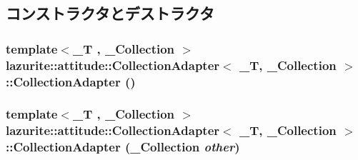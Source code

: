\subsection{コンストラクタとデストラクタ}
\hypertarget{classlazurite_1_1attitude_1_1_collection_adapter_3_01___t_00_01___collection_01_4_a582a6fdefe2ce5009133aca0ca88fdae}{
\subsubsection[{CollectionAdapter}]{\setlength{\rightskip}{0pt plus 5cm}template$<$\_\-T , \_\-Collection $>$ lazurite::attitude::CollectionAdapter$<$ \_\-T, \_\-Collection $>$::CollectionAdapter ()}}
\label{classlazurite_1_1attitude_1_1_collection_adapter_3_01___t_00_01___collection_01_4_a582a6fdefe2ce5009133aca0ca88fdae}
\hypertarget{classlazurite_1_1attitude_1_1_collection_adapter_3_01___t_00_01___collection_01_4_a0c11c94e8d15aa12c8a933dc3a4613e1}{
\subsubsection[{CollectionAdapter}]{\setlength{\rightskip}{0pt plus 5cm}template$<$\_\-T , \_\-Collection $>$ lazurite::attitude::CollectionAdapter$<$ \_\-T, \_\-Collection $>$::CollectionAdapter (\_\-Collection {\em other})}}
\label{classlazurite_1_1attitude_1_1_collection_adapter_3_01___t_00_01___collection_01_4_a0c11c94e8d15aa12c8a933dc3a4613e1}

